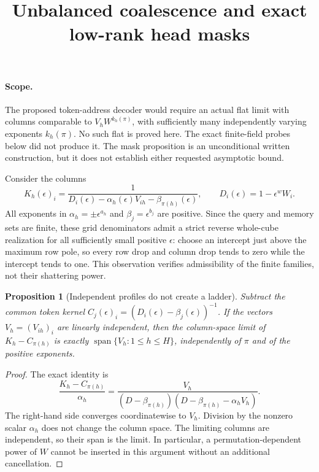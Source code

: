 \documentclass[11pt]{article}
\title{Unbalanced coalescence and exact low-rank head masks}
\author{}
\date{}
\newtheorem{proposition}{Proposition}
\begin{document}
\maketitle

\paragraph{Scope.}
The proposed token-address decoder would require an actual flat limit
with columns comparable to $V_hW^{k_h(\pi)}$, with sufficiently many
independently varying exponents $k_h(\pi)$. No such flat is proved here.
The exact finite-field probes below did not produce it. The mask
proposition is an unconditional written construction, but it does not
establish either requested asymptotic bound.

Consider the columns
\[
 K_h(\epsilon)_i=
 \frac1{D_i(\epsilon)-\alpha_h(\epsilon)V_{ih}
                      -\beta_{\pi(h)}(\epsilon)},
 \qquad D_i(\epsilon)=1-\epsilon^w W_i.
\]
All exponents in $\alpha_h=\pm\epsilon^{a_h}$ and
$\beta_j=\epsilon^{b_j}$ are positive. Since the query and memory
sets are finite, these grid denominators admit a strict reverse
whole-cube realization for all sufficiently small positive
$\epsilon$: choose an intercept just above the maximum row pole,
so every row drop and column drop tends to zero while the intercept
tends to one. This observation verifies admissibility of the finite
families, not their shattering power.

\begin{proposition}[Independent profiles do not create a ladder]
Subtract the common token kernel
$C_j(\epsilon)_i=(D_i(\epsilon)-\beta_j(\epsilon))^{-1}$.
If the vectors $V_h=(V_{ih})_i$ are linearly independent, then the
column-space limit of $K_h-C_{\pi(h)}$ is exactly
$\operatorname{span}\{V_h:1\leq h\leq H\}$, independently of $\pi$
and of the positive exponents.
\end{proposition}
\begin{proof}
The exact identity is
\[
 \frac{K_h-C_{\pi(h)}}{\alpha_h}
 =\frac{V_h}{(D-\beta_{\pi(h)})
                  (D-\beta_{\pi(h)}-\alpha_hV_h)}.
\]
The right-hand side converges coordinatewise to $V_h$. Division by
the nonzero scalar $\alpha_h$ does not change the column space.
The limiting columns are independent, so their span is the limit.
In particular, a permutation-dependent power of $W$ cannot be
inserted in this argument without an additional cancellation.
\end{proof}
\end{document}
